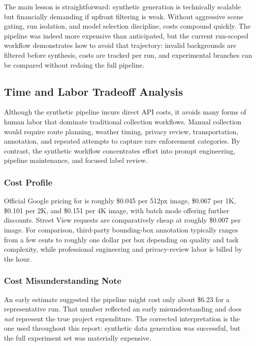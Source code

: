 \documentclass[12pt,a4paper]{article}
\newcommand{\command}[1]{\texttt{\detokenize{#1}}}
\begin{document}
The main lesson is straightforward: synthetic generation is technically scalable but financially demanding if upfront filtering is weak. Without aggressive scene gating, run isolation, and model selection discipline, costs compound quickly. The pipeline was indeed more expensive than anticipated, but the current run-scoped workflow demonstrates how to avoid that trajectory: invalid backgrounds are filtered before synthesis, costs are tracked per run, and experimental branches can be compared without redoing the full pipeline.

\subsection{Time and Labor Tradeoff Analysis}

Although the synthetic pipeline incurs direct API costs, it avoids many forms of human labor that dominate traditional collection workflows. Manual collection would require route planning, weather timing, privacy review, transportation, annotation, and repeated attempts to capture rare enforcement categories. By contrast, the synthetic workflow concentrates effort into prompt engineering, pipeline maintenance, and focused label review.

\subsubsection{Cost Profile}

Official Google pricing for \command{gemini-3.1-flash-image-preview} is roughly \$0.045 per 512px image, \$0.067 per 1K, \$0.101 per 2K, and \$0.151 per 4K image, with batch mode offering further discounts. Street View requests are comparatively cheap at roughly \$0.007 per image. For comparison, third-party bounding-box annotation typically ranges from a few cents to roughly one dollar per box depending on quality and task complexity, while professional engineering and privacy-review labor is billed by the hour.

\subsubsection{Cost Misunderstanding Note}

An early estimate suggested the pipeline might cost only about \$6.23 for a representative run. That number reflected an early misunderstanding and does \emph{not} represent the true project expenditure. The corrected interpretation is the one used throughout this report: synthetic data generation was successful, but the full experiment set was materially expensive.
\end{document}
